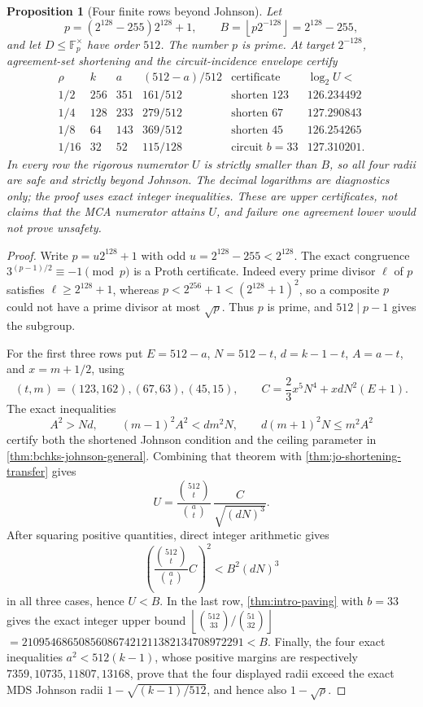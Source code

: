 \documentclass[11pt,a4paper]{amsart}
\numberwithin{equation}{section}
\newtheorem{proposition}[proposition]{Proposition}
\theoremstyle{remark}
\newcommand{\F}{\mathbb F}
\newcommand{\floor}[1]{\left\lfloor #1\right\rfloor}
\begin{document}
\begin{proposition}[Four finite rows beyond Johnson]
\label{prop:paving-finite-rows}
Let
\[
 p=(2^{128}-255)2^{128}+1,\qquad
 B=\floor{p2^{-128}}=2^{128}-255,
\]
and let \(D\le\F_p^\times\) have order \(512\).  The number \(p\) is
prime.  At target \(2^{-128}\), agreement-set shortening and the
circuit-incidence envelope certify
\[
\begin{array}{c|c|c|c|c|c}
 \rho&k&a&(512-a)/512&\text{certificate}&\log_2 U<\\ \hline
 1/2&256&351&161/512&\text{shorten }123&126.234492\\
 1/4&128&233&279/512&\text{shorten }67&127.290843\\
 1/8&64 &143&369/512&\text{shorten }45&126.254265\\
 1/16&32&52&115/128&\text{circuit }b=33&127.310201.
\end{array}                                       \tag{F512}
 \label{eq:paving-finite-rows}
\]
In every row the rigorous numerator \(U\) is strictly smaller than \(B\),
so all four radii are safe and strictly beyond Johnson.  The decimal
logarithms are diagnostics only; the proof uses exact integer inequalities.
These are upper certificates, not claims that the MCA numerator attains
\(U\), and failure one agreement lower would not prove unsafety.
\end{proposition}

\begin{proof}
Write \(p=u2^{128}+1\) with odd \(u=2^{128}-255<2^{128}\).
The exact congruence
\(3^{(p-1)/2}\equiv-1\pmod p\) is a Proth certificate.  Indeed every
prime divisor \(\ell\) of \(p\) satisfies
\(\ell\ge2^{128}+1\), whereas
\(p<2^{256}+1<(2^{128}+1)^2\), so a composite \(p\) could not have a
prime divisor at most \(\sqrt p\).  Thus \(p\) is prime, and
\(512\mid p-1\) gives the subgroup.

For the first three rows put
\(E=512-a\), \(N=512-t\), \(d=k-1-t\), \(A=a-t\), and
\(x=m+1/2\), using
\[
 (t,m)=(123,162),(67,63),(45,15),\qquad
 C=\frac23x^5N^4+xdN^2(E+1).
\]
The exact inequalities
\[
 A^2>Nd,\qquad (m-1)^2A^2<dm^2N,\qquad
 d(m+1)^2N\le m^2A^2
\]
certify both the shortened Johnson condition and the ceiling parameter in
\cref{thm:bchks-johnson-general}.  Combining that theorem with
\cref{thm:jo-shortening-transfer} gives
\[
 U=\frac{\binom{512}{t}}{\binom at}\,
       \frac{C}{\sqrt{(dN)^3}}.
\]
After squaring positive quantities, direct integer arithmetic gives
\[
 \left(\frac{\binom{512}{t}}{\binom at}C\right)^2
 <B^2(dN)^3
\]
in all three cases, hence \(U<B\).  In the last row,
\cref{thm:intro-paving} with \(b=33\) gives the exact integer upper bound
\(\floor{\binom{512}{33}/\binom{51}{32}}\)
\(=210954686508560867421211382134708972291<B\).
Finally, the four exact inequalities \(a^2<512(k-1)\), whose positive
margins are respectively \(7359,10735,11807,13168\), prove that the four
displayed radii exceed the exact MDS Johnson radii
\(1-\sqrt{(k-1)/512}\), and hence also \(1-\sqrt\rho\).
\end{proof}
\end{document}
